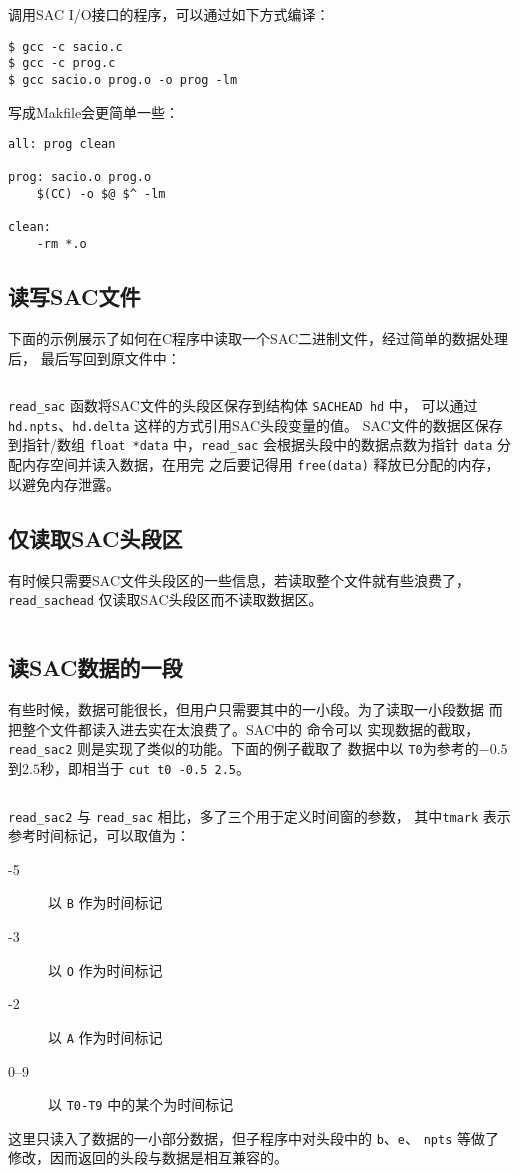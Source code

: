 调用SAC I/O接口的程序，可以通过如下方式编译：
\begin{verbatim}
$ gcc -c sacio.c
$ gcc -c prog.c
$ gcc sacio.o prog.o -o prog -lm
\end{verbatim}

写成Makfile会更简单一些：
\begin{verbatim}
all: prog clean

prog: sacio.o prog.o
    $(CC) -o $@ $^ -lm

clean:
    -rm *.o
\end{verbatim}

\subsection{读写SAC文件}
下面的示例展示了如何在C程序中读取一个SAC二进制文件，经过简单的数据处理后，
最后写回到原文件中：
\inputminted{C}{./sacio/readsac.c}
\verb|read_sac| 函数将SAC文件的头段区保存到结构体 \texttt{SACHEAD hd} 中，
可以通过 \texttt{hd.npts}、\texttt{hd.delta} 这样的方式引用SAC头段变量的值。
SAC文件的数据区保存到指针/数组 \texttt{float *data} 中，\verb|read_sac|
会根据头段中的数据点数为指针 \texttt{data} 分配内存空间并读入数据，在用完
之后要记得用 \texttt{free(data)} 释放已分配的内存，以避免内存泄露。

\subsection{仅读取SAC头段区}
有时候只需要SAC文件头段区的一些信息，若读取整个文件就有些浪费了，
\verb|read_sachead| 仅读取SAC头段区而不读取数据区。
\inputminted{C}{./sacio/readsachead.c}

\subsection{读SAC数据的一段}
有些时候，数据可能很长，但用户只需要其中的一小段。为了读取一小段数据
而把整个文件都读入进去实在太浪费了。SAC中的  命令可以
实现数据的截取，\verb|read_sac2| 则是实现了类似的功能。下面的例子截取了
数据中以 \texttt{T0}为参考的$-0.5$到$2.5$秒，即相当于 \texttt{cut t0 -0.5 2.5}。
\inputminted{C}{./sacio/readsac2.c}
\verb|read_sac2| 与 \verb|read_sac| 相比，多了三个用于定义时间窗的参数，
其中\texttt{tmark} 表示参考时间标记，可以取值为：
\begin{description}
\item[-5] 以 \texttt{B} 作为时间标记
\item[-3] 以 \texttt{O} 作为时间标记
\item[-2] 以 \texttt{A} 作为时间标记
\item[0--9] 以 \texttt{T0-T9} 中的某个为时间标记
\end{description}
这里只读入了数据的一小部分数据，但子程序中对头段中的 \texttt{b}、\texttt{e}、
\texttt{npts} 等做了修改，因而返回的头段与数据是相互兼容的。

